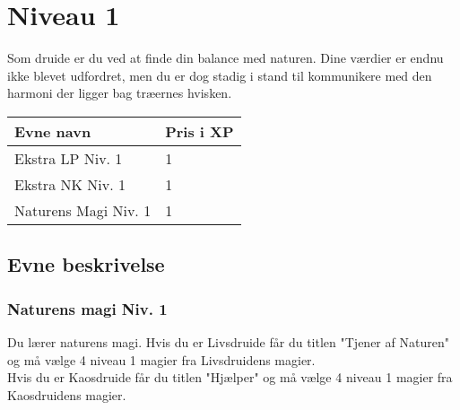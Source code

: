 \chapter{Niveau 1}
Som druide er du ved at finde din balance med naturen. Dine værdier er endnu ikke blevet udfordret, men du er dog stadig i stand til kommunikere med den harmoni der ligger bag træernes hvisken. 

\begin{table}[H]
    \centering
    \begin{tabular}{|p{}|p{}|}
    \rowcolor{cerulean!80}\hline
        Evne navn & Pris i XP \\\hline
        Ekstra LP Niv. 1 & 1\\\hline
        Ekstra NK Niv. 1& 1\\\hline
        Naturens Magi Niv. 1& 1\\\hline
    \end{tabular}
\end{table}

\section{Evne beskrivelse}





\subsection{Naturens magi Niv. 1}
Du lærer naturens magi. Hvis du er Livsdruide får du titlen "Tjener af Naturen" og må vælge 4 niveau 1 magier fra Livsdruidens magier.\\ Hvis du er Kaosdruide får du titlen "Hjælper" og må vælge 4 niveau 1 magier fra Kaosdruidens magier.